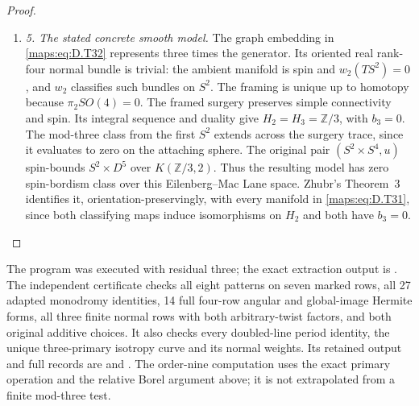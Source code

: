\begin{proof}
\begin{enumerate}[label=\arabic*.,leftmargin=*]
\item \emph{5. The stated concrete smooth model.}
The graph embedding in \eqref{maps:eq:D.T32} represents three times the generator.
Its oriented real rank-four normal bundle is trivial: the ambient
manifold is spin and $w_2(TS^2)=0$, and $w_2$ classifies such bundles
on $S^2$. The framing is unique up to homotopy because
$\pi_2SO(4)=0$. The framed surgery preserves simple connectivity
and spin. Its integral sequence and duality give
$H_2=H_3=\mathbb Z/3$, with $b_3=0$.
The mod-three class from the first $S^2$ extends across the surgery
trace, since it evaluates to zero on the attaching sphere.
The original pair $(S^2\times S^4,u)$ spin-bounds
$S^2\times D^5$ over $K(\mathbb Z/3,2)$.
Thus the resulting model has zero spin-bordism class over this
Eilenberg--Mac Lane space. Zhubr's Theorem~3
\cite[p.795]{manZhubr75} identifies it, orientation-preservingly,
with every manifold in \eqref{maps:eq:D.T31}, since both classifying maps induce
isomorphisms on $H_2$ and both have $b_3=0$.
\end{enumerate}
\end{proof}

The program  was executed with
residual three; the exact extraction output is
.
The independent certificate 
checks all eight patterns on seven marked rows, all 27 adapted
monodromy identities, 14 full four-row angular and global-image
Hermite forms, all three finite normal rows with both arbitrary-twist
factors, and both original additive choices. It also checks every
doubled-line period identity, the unique three-primary isotropy
curve and its normal weights. Its retained output and full
records are  and
. The order-nine computation
uses the exact primary operation and the relative Borel argument
above; it is not extrapolated from a finite mod-three test.


